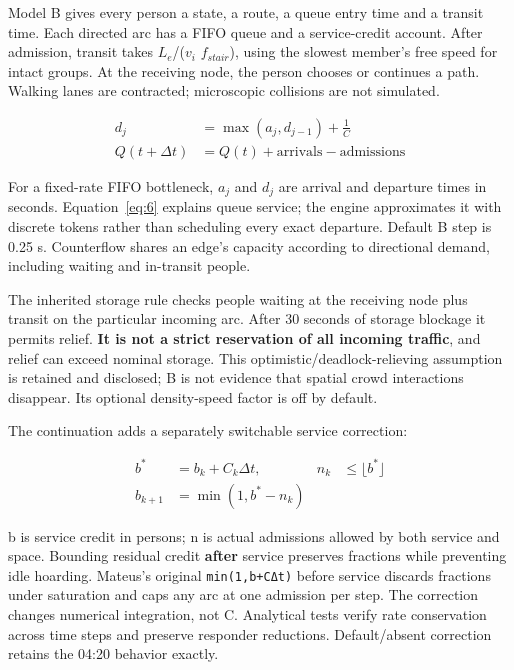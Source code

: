 \documentclass[11pt,a4paper]{article}
\newcommand{\code}[1]{{\small\nolinkurl{#1}}}
\begin{document}
Model B gives every person a state, a route, a queue entry time and a transit time. Each directed arc has a FIFO queue and a service-credit account. After admission, transit takes \ensuremath{L_{e}}/(\ensuremath{v_{i}} \ensuremath{f_{stair}}), using the slowest member's free speed for intact groups. At the receiving node, the person chooses or continues a path. Walking lanes are contracted; microscopic collisions are not simulated.


\begin{equation}
\begin{aligned}
d_j &=\max(a_j,d_{j-1})+\frac1C \\
Q(t+\Delta t)&=Q(t)+\text{arrivals}-\text{admissions}
\end{aligned}
\tag{6}\label{eq:6}
\end{equation}

For a fixed-rate FIFO bottleneck, \ensuremath{a_{j}} and \ensuremath{d_{j}} are arrival and departure times in seconds. Equation~\eqref{eq:6} explains queue service; the engine approximates it with discrete tokens rather than scheduling every exact departure. Default B step is 0.25 s. Counterflow shares an edge's capacity according to directional demand, including waiting and in-transit people.


The inherited storage rule checks people waiting at the receiving node plus transit on the particular incoming arc. After 30 seconds of storage blockage it permits relief. \textbf{It is not a strict reservation of all incoming traffic}, and relief can exceed nominal storage. This optimistic/deadlock-relieving assumption is retained and disclosed; B is not evidence that spatial crowd interactions disappear. Its optional density-speed factor is off by default.


The continuation adds a separately switchable service correction:


\begin{equation}
\begin{aligned}
b^*&=b_k+C_k\Delta t, & n_k&\le\lfloor b^*\rfloor \\
b_{k+1}&=\min(1,b^*-n_k)
\end{aligned}
\tag{7}\label{eq:7}
\end{equation}

b is service credit in persons; n is actual admissions allowed by both service and space. Bounding residual credit \textbf{after} service preserves fractions while preventing idle hoarding. Mateus's original \code{min(1,b+CΔt)} before service discards fractions under saturation and caps any arc at one admission per step. The correction changes numerical integration, not C. Analytical tests verify rate conservation across time steps and preserve responder reductions. Default/absent correction retains the 04:20 behavior exactly.
\end{document}
